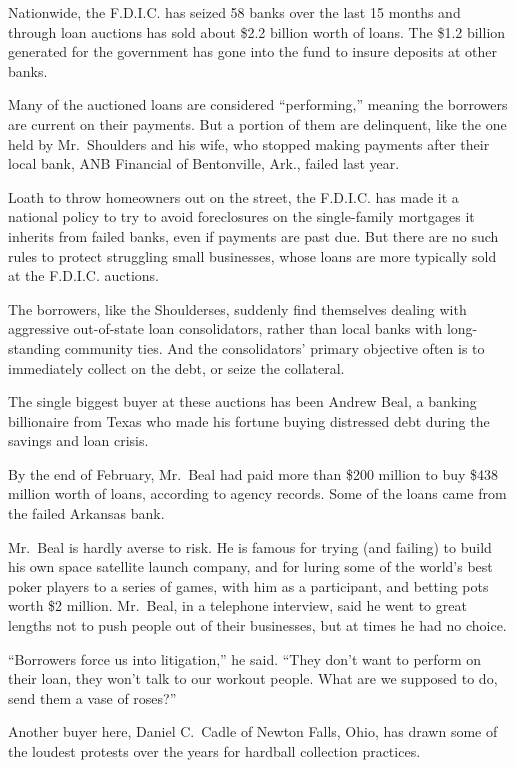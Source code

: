 \documentclass[12pt,a4paper,onecolumn]{article}
\begin{document}
Nationwide, the F.D.I.C. has seized 58 banks over the last 15 months and through loan auctions has
sold about \$2.2 billion worth of loans. The \$1.2 billion generated for the government has gone
into the fund to insure deposits at other banks.

Many of the auctioned loans are considered ``performing,'' meaning the borrowers are current on
their payments. But a portion of them are delinquent, like the one held by Mr.~Shoulders and his
wife, who stopped making payments after their local bank, ANB Financial of Bentonville, Ark., failed
last year.

Loath to throw homeowners out on the street, the F.D.I.C. has made it a national policy to try to
avoid foreclosures on the single-family mortgages it inherits from failed banks, even if payments
are past due. But there are no such rules to protect struggling small businesses, whose loans are
more typically sold at the F.D.I.C. auctions.

The borrowers, like the Shoulderses, suddenly find themselves dealing with aggressive out-of-state
loan consolidators, rather than local banks with long-standing community ties. And the
consolidators' primary objective often is to immediately collect on the debt, or seize the
collateral.

The single biggest buyer at these auctions has been Andrew Beal, a banking billionaire from Texas
who made his fortune buying distressed debt during the savings and loan crisis.

By the end of February, Mr.~Beal had paid more than \$200 million to buy \$438 million worth of
loans, according to agency records. Some of the loans came from the failed Arkansas bank.

Mr.~Beal is hardly averse to risk. He is famous for trying (and failing) to build his own space
satellite launch company, and for luring some of the world's best poker players to a series of
games, with him as a participant, and betting pots worth \$2 million. Mr.~Beal, in a telephone
interview, said he went to great lengths not to push people out of their businesses, but at times he
had no choice.

``Borrowers force us into litigation,'' he said. ``They don't want to perform on their loan, they
won't talk to our workout people. What are we supposed to do, send them a vase of roses?''

Another buyer here, Daniel C.~Cadle of Newton Falls, Ohio, has drawn some of the loudest protests
over the years for hardball collection practices.
\end{document}
